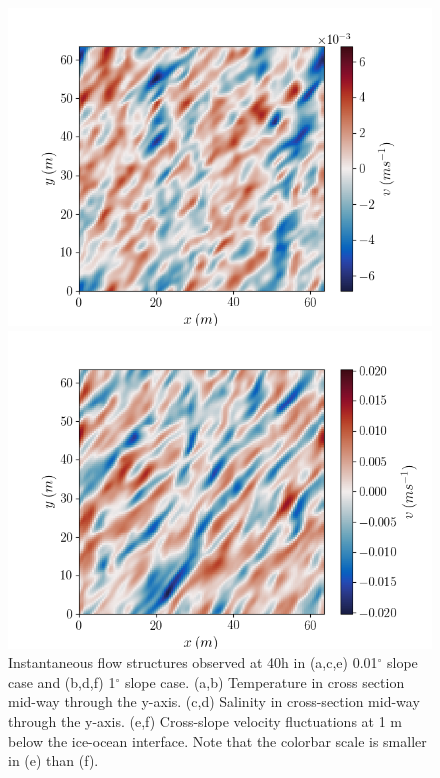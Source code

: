 \documentclass[draft]{agujournal2019}
\begin{document}
\begin{figure}[h!]
\begin{minipage}{0.45\textwidth}
        \includegraphics[trim={0 0cm 1cm 0},clip,width=\textwidth]{Figures/dslope2/v_xy_z1_zmax1_t40.png}
    \end{minipage}%
    \begin{minipage}{0.45\textwidth}
        \includegraphics[trim={1cm 0cm 0cm 0},clip,width=\textwidth]{Figures/dT1/v_xy_z1_zmax1_t40.png}
    \end{minipage}%
    \begin{minipage}{0.05\textwidth}
    \hfill
    \end{minipage}
    \caption{Instantaneous flow structures observed at 40h in (a,c,e) 0.01$^{\circ}$ slope case and (b,d,f) 1$^{\circ}$ slope case. (a,b) Temperature in cross section mid-way through the y-axis. (c,d) Salinity in cross-section mid-way through the y-axis. (e,f) Cross-slope velocity fluctuations at 1 m below the ice-ocean interface. Note that the colorbar scale is smaller in (e) than (f).}
    \label{fig:cross-section}
\end{figure}
\end{document}
